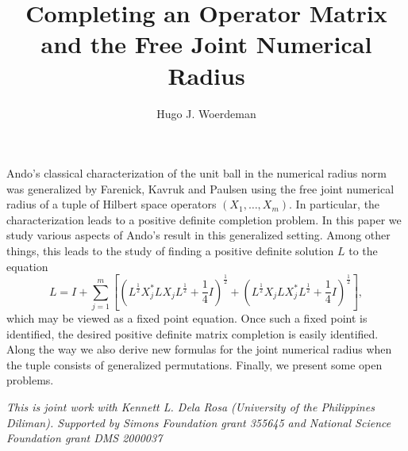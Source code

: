 \documentclass[a4paper]{amsart}
\date{}
\begin{document}
\title{Completing an Operator Matrix and the Free Joint Numerical Radius}
\author{Hugo J. Woerdeman} %
\address{Drexel University} %

\maketitle


Ando's \cite{tA73} classical characterization of the unit ball in the numerical radius norm was generalized by Farenick, Kavruk and Paulsen \cite{dFA13} using the free joint numerical radius of a tuple of Hilbert space operators $(X_1, \ldots , X_m)$. In particular, the characterization leads to a positive definite completion problem. In this paper we study various aspects of Ando's result in this generalized setting. Among other things, this leads to the study of finding a positive definite solution $L$ to the equation 
%
\[L=I+\displaystyle\sum_{j=1}^m\left[\left(L^{\frac{1}{2}}X_j^*LX_jL^{\frac{1}{2}}+\frac{1}{4}I\right)^{\frac{1}{2}}+\left(L^{\frac{1}{2}}X_jLX_j^*L^{\frac{1}{2}}+\frac{1}{4}I\right)^{\frac{1}{2}}\right],\] 
which may be viewed as a fixed point equation.
Once such a fixed point is identified, the desired positive definite matrix completion is easily identified. Along the way we also derive new formulas for the  joint numerical radius when the tuple consists of generalized permutations. Finally, we present some open problems.
\medskip

\emph{This is joint work with Kennett L. Dela Rosa (University of the Philippines Diliman).
Supported by Simons Foundation grant 355645 and National Science Foundation grant DMS 2000037}
\end{document}
